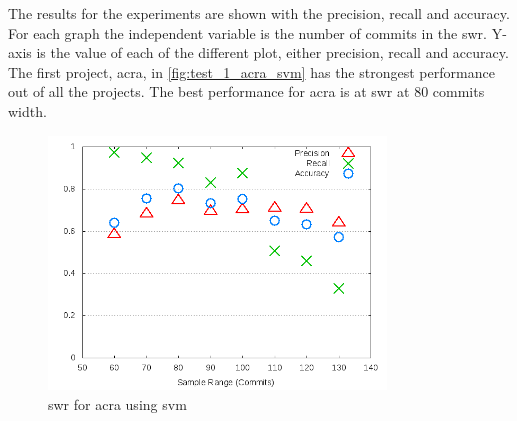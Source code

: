 The results for the experiments are shown with the precision, recall and accuracy. For each graph the independent variable is the number of commits in the \gls{swr}. Y-axis is the value of each of the different plot, either precision, recall and accuracy. The first project, acra, in \autoref{fig:test_1_acra_svm} has the strongest performance out of all the projects. The best performance for acra is at \gls{swr} at 80 commits width.



\begin{figure}[!ht]
    \centering

        \includegraphics[width=0.8\textwidth]{images/svm/test_1/acra_sample_range}
        \caption{\gls{swr} for acra using \gls{svm}}
        \label{fig:test_1_acra_svm}
\end{figure}

